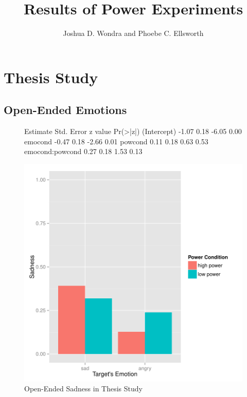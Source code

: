 \documentclass[man,apacite,floatsintext]{apa6}
\title{Results of Power Experiments}
\author{Joshua D. Wondra and Phoebe C. Ellsworth}
\affiliation{University of Michigan}
\begin{document}

\maketitle

\section{Thesis Study}
\subsection{Open-Ended Emotions}

\begin{figure}
\begin{Schunk}
\begin{Soutput}
                Estimate Std. Error z value Pr(>|z|)
(Intercept)        -1.07       0.18   -6.05     0.00
emocond            -0.47       0.18   -2.66     0.01
powcond             0.11       0.18    0.63     0.53
emocond:powcond     0.27       0.18    1.53     0.13
\end{Soutput}
\end{Schunk}
\includegraphics{PowerResults-ThesisOpenSad}
\caption{Open-Ended Sadness in Thesis Study}
\end{figure}
\newpage
\end{document}
